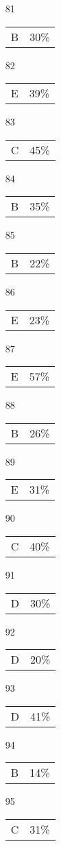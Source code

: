 \documentclass[12pt]{article}
\begin{document}
\begin{multicols}{5}
\begin{enumerate}
\item[81] \begin{tabular}{cc} B & 30\%\end{tabular}
\item[82] \begin{tabular}{cc} E & 39\%\end{tabular}
\item[83] \begin{tabular}{cc} C & 45\%\end{tabular}
\item[84] \begin{tabular}{cc} B & 35\%\end{tabular}
\item[85] \begin{tabular}{cc} B & 22\%\end{tabular}
\item[]
\item[86] \begin{tabular}{cc} E & 23\%\end{tabular}
\item[87] \begin{tabular}{cc} E & 57\%\end{tabular}
\item[88] \begin{tabular}{cc} B & 26\%\end{tabular}
\item[89] \begin{tabular}{cc} E & 31\%\end{tabular}
\item[90] \begin{tabular}{cc} C & 40\%\end{tabular}
\item[]
\item[91] \begin{tabular}{cc} D & 30\%\end{tabular}
\item[92] \begin{tabular}{cc} D & 20\%\end{tabular}
\item[93] \begin{tabular}{cc} D & 41\%\end{tabular}
\item[94] \begin{tabular}{cc} B &14\%\end{tabular}
\item[95] \begin{tabular}{cc} C & 31\%\end{tabular}

\end{enumerate}
\end{multicols}
\end{document}
